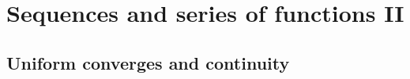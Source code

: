 \documentclass[12pt, a4paper]{article}
\begin{document}






\section{Sequences and series of functions II}

\subsection{Uniform converges and continuity}
\end{document}
